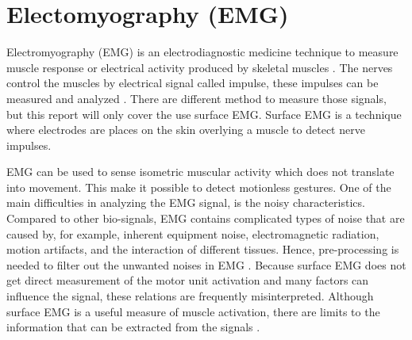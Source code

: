 \section{Electomyography (EMG)}
Electromyography (EMG) is an electrodiagnostic medicine technique to measure muscle response or electrical activity produced by skeletal muscles \cite{wiki:Electromyography}. The nerves control the muscles by electrical signal called impulse, these impulses can be measured and analyzed \cite{WebMD:Electromyogram}. There are different method to measure those signals, but this report will only cover the use surface EMG. Surface EMG is a technique where electrodes are places on the skin overlying a muscle to detect nerve impulses. 

EMG can be used to sense isometric muscular activity which does not translate into movement. This make it possible to detect motionless gestures. One of the main difficulties in analyzing the EMG signal, is the noisy characteristics. Compared to other bio-signals, EMG contains complicated types of noise that are caused by, for example, inherent equipment noise, electromagnetic radiation, motion artifacts, and the interaction of different tissues. Hence, pre-processing is needed to filter out the unwanted noises in EMG \cite{kim2008emg}. Because surface EMG does not get direct measurement of the motor unit activation and many factors can influence the signal, these relations are frequently misinterpreted. Although surface EMG is a useful measure of muscle activation, there are limits to the information that can be extracted from the signals \cite{farina2004extraction}.